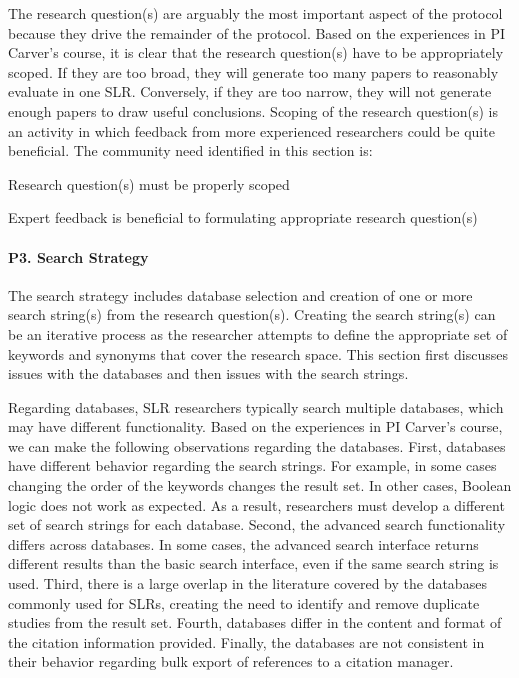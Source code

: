 The research question(s) are arguably the most important aspect of the protocol because they drive the remainder of the protocol. Based on the experiences in PI Carver's course, it is clear that the research question(s) have to be appropriately scoped. If they are too broad, they will generate too many papers to reasonably evaluate in one SLR. Conversely, if they are too narrow, they will not generate enough papers to draw useful conclusions. Scoping of the research question(s) is an activity in which feedback from more experienced researchers could be quite beneficial. The community need identified in this section is:
\vspace*{-4pt}
\begin{itemize*}
\begin{bfseries}
\item Research question(s) must be properly scoped
\item Expert feedback is beneficial to formulating appropriate research question(s)
\end{bfseries}
\end{itemize*}
\vspace*{-4pt}

\paragraph{P3. Search Strategy}

The search strategy includes database selection and creation of one or more search string(s) from the research question(s). Creating the search string(s) can be an iterative process as the researcher attempts to define the appropriate set of keywords and synonyms that cover the research space. This section first discusses issues with the databases and then issues with the search strings.

Regarding databases, SLR researchers typically search multiple databases, which may have different functionality. Based on the experiences in PI Carver's course, we can make the following observations regarding the databases. First, databases have different behavior regarding the search strings. For example, in some cases changing the order of the keywords changes the result set. In other cases, Boolean logic does not work as expected. As a result, researchers must develop a different set of search strings for each database. Second, the advanced search functionality differs across databases. In some cases, the advanced search interface returns different results than the basic search interface, even if the same search string is used. Third, there is a large overlap in the literature covered by the databases commonly used for SLRs, creating the need to identify and remove duplicate studies from the result set. Fourth, databases differ in the content and format of the citation information provided. Finally, the databases are not consistent in their behavior regarding bulk export of references to a citation manager.


